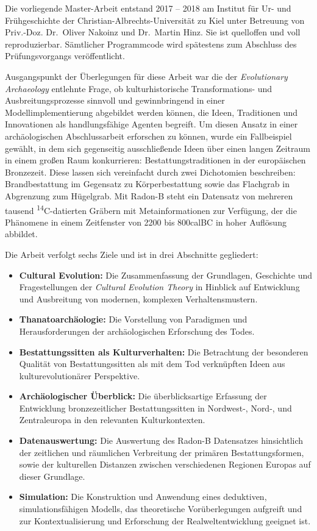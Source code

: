 \documentclass[openany,twoside,twocolumn]{book}
\providecommand{\tightlist}{%
  \setlength{\itemsep}{0pt}\setlength{\parskip}{0pt}}
\begin{document}
Die vorliegende Master-Arbeit entstand 2017 -- 2018 am Institut für Ur-
und Frühgeschichte der Christian-Albrechts-Universität zu Kiel unter
Betreuung von Priv.-Doz. Dr.~Oliver Nakoinz und Dr.~Martin Hinz. Sie ist
quelloffen und voll reproduzierbar. Sämtlicher Programmcode wird
spätestens zum Abschluss des Prüfungsvorgangs veröffentlicht.

Ausgangspunkt der Überlegungen für diese Arbeit war die der
\emph{Evolutionary Archaeology} entlehnte Frage, ob kulturhistorische
Transformations- und Ausbreitungsprozesse sinnvoll und gewinnbringend in
einer Modellimplementierung abgebildet werden können, die Ideen,
Traditionen und Innovationen als handlungsfähige Agenten begreift. Um
diesen Ansatz in einer archäologischen Abschlussarbeit erforschen zu
können, wurde ein Fallbeispiel gewählt, in dem sich gegenseitig
ausschließende Ideen über einen langen Zeitraum in einem großen Raum
konkurrieren: Bestattungstraditionen in der europäischen Bronzezeit.
Diese lassen sich vereinfacht durch zwei Dichotomien beschreiben:
Brandbestattung im Gegensatz zu Körperbestattung sowie das Flachgrab in
Abgrenzung zum Hügelgrab. Mit Radon-B steht ein Datensatz von mehreren
tausend \textsuperscript{14}C-datierten Gräbern mit Metainformationen
zur Verfügung, der die Phänomene in einem Zeitfenster von 2200 bis
800calBC in hoher Auflösung abbildet.

Die Arbeit verfolgt sechs Ziele und ist in drei Abschnitte gegliedert:

\begin{itemize}
\tightlist
\item
  \textbf{Cultural Evolution:} Die Zusammenfassung der Grundlagen,
  Geschichte und Fragestellungen der \emph{Cultural Evolution Theory} in
  Hinblick auf Entwicklung und Ausbreitung von modernen, komplexen
  Verhaltensmustern.
\item
  \textbf{Thanatoarchäologie:} Die Vorstellung von Paradigmen und
  Herausforderungen der archäologischen Erforschung des Todes.
\item
  \textbf{Bestattungssitten als Kulturverhalten:} Die Betrachtung der
  besonderen Qualität von Bestattungssitten als mit dem Tod verknüpften
  Ideen aus kulturevolutionärer Perspektive.
\item
  \textbf{Archäologischer Überblick:} Die überblicksartige Erfassung der
  Entwicklung bronzezeitlicher Bestattungssitten in Nordwest-, Nord-,
  und Zentraleuropa in den relevanten Kulturkontexten.
\item
  \textbf{Datenauswertung:} Die Auswertung des Radon-B Datensatzes
  hinsichtlich der zeitlichen und räumlichen Verbreitung der primären
  Bestattungsformen, sowie der kulturellen Distanzen zwischen
  verschiedenen Regionen Europas auf dieser Grundlage.
\item
  \textbf{Simulation:} Die Konstruktion und Anwendung eines deduktiven,
  simulationsfähigen Modells, das theoretische Vorüberlegungen aufgreift
  und zur Kontextualisierung und Erforschung der Realweltentwicklung
  geeignet ist.
\end{itemize}
\end{document}
